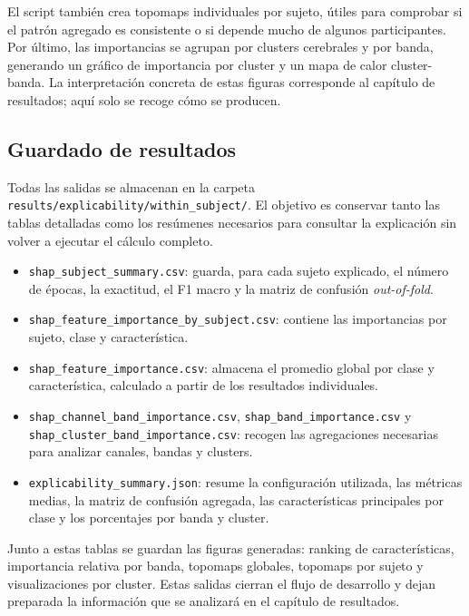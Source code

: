 El script también crea topomaps individuales por sujeto, útiles para comprobar si el patrón agregado es consistente o si depende mucho de algunos participantes. Por último, las importancias se agrupan por clusters cerebrales y por banda, generando un gráfico de importancia por cluster y un mapa de calor cluster-banda. La interpretación concreta de estas figuras corresponde al capítulo de resultados; aquí solo se recoge cómo se producen.

\subsection{Guardado de resultados}

Todas las salidas se almacenan en la carpeta \texttt{results/explicability/within\_subject/}. El objetivo es conservar tanto las tablas detalladas como los resúmenes necesarios para consultar la explicación sin volver a ejecutar el cálculo completo.

\begin{itemize}
    \item \texttt{shap\_subject\_summary.csv}: guarda, para cada sujeto explicado, el número de épocas, la exactitud, el F1 macro y la matriz de confusión \textit{out-of-fold}.
    \item \texttt{shap\_feature\_importance\_by\_subject.csv}: contiene las importancias por sujeto, clase y característica.
    \item \texttt{shap\_feature\_importance.csv}: almacena el promedio global por clase y característica, calculado a partir de los resultados individuales.
    \item \texttt{shap\_channel\_band\_importance.csv}, \texttt{shap\_band\_importance.csv} y \texttt{shap\_cluster\_band\_importance.csv}: recogen las agregaciones necesarias para analizar canales, bandas y clusters.
    \item \texttt{explicability\_summary.json}: resume la configuración utilizada, las métricas medias, la matriz de confusión agregada, las características principales por clase y los porcentajes por banda y cluster.
\end{itemize}

Junto a estas tablas se guardan las figuras generadas: ranking de características, importancia relativa por banda, topomaps globales, topomaps por sujeto y visualizaciones por cluster. Estas salidas cierran el flujo de desarrollo y dejan preparada la información que se analizará en el capítulo de resultados.

